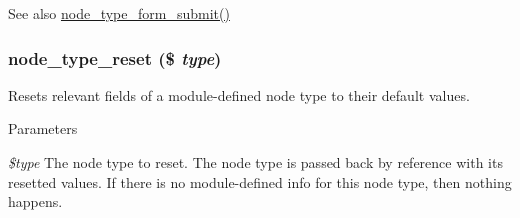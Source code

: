 \begin{DoxySeeAlso}{See also}
\hyperlink{content__types_8inc_afa55f7240b05f2a2804c11766228a5af}{node\_\-type\_\-form\_\-submit()} 
\end{DoxySeeAlso}
\hypertarget{content__types_8inc_ace3bf5d2cd2982ff539bff787ae1e44e}{
\subsubsection[{node\_\-type\_\-reset}]{\setlength{\rightskip}{0pt plus 5cm}node\_\-type\_\-reset (\$ {\em type})}}
\label{content__types_8inc_ace3bf5d2cd2982ff539bff787ae1e44e}
Resets relevant fields of a module-\/defined node type to their default values.


\begin{DoxyParams}{Parameters}
\item[{\em \$type}]The node type to reset. The node type is passed back by reference with its resetted values. If there is no module-\/defined info for this node type, then nothing happens. \end{DoxyParams}
